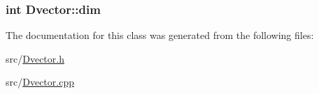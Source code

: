 \subsubsection[{\texorpdfstring{dim}{dim}}]{\setlength{\rightskip}{0pt plus 5cm}int Dvector\+::dim}\hypertarget{class_dvector_aaa143e03a245cdc68eb1bfa731e36cdc}{}\label{class_dvector_aaa143e03a245cdc68eb1bfa731e36cdc}


The documentation for this class was generated from the following files\+:\begin{DoxyCompactItemize}
\item 
src/\hyperlink{_dvector_8h}{Dvector.\+h}\item 
src/\hyperlink{_dvector_8cpp}{Dvector.\+cpp}\end{DoxyCompactItemize}
